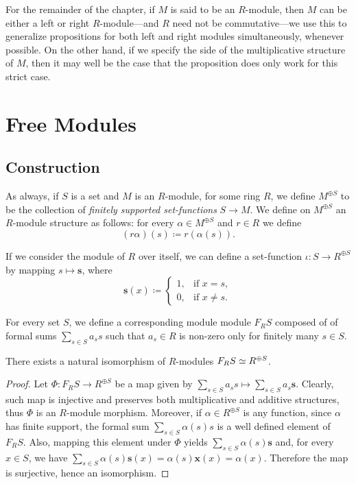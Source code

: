 \begin{remark}
\label{rem:R-modules-convension}
For the remainder of the chapter, if \(M\) is said to be an \(R\)-module, then
\(M\) can be either a left or right \(R\)-module---and \(R\) need not be
commutative---we use this to generalize propositions for both left and right
modules simultaneously, whenever possible. On the other hand, if we specify the
side of the multiplicative structure of \(M\), then it may well be the case that
the proposition does only work for this strict case.
\end{remark}

\section{Free Modules}

\subsection{Construction}

As always, if \(S\) is a set and \(M\) is an \(R\)-module, for some ring \(R\),
we define \(M^{\oplus S}\) to be the collection of \emph{finitely supported
  set-functions} \(S \to M\). We define on \(M^{\oplus S}\) an \(R\)-module
structure as follows: for every \(\alpha \in M^{\oplus S}\) and \(r \in R\) we
define
\[
(r \alpha)(s) \coloneq r (\alpha(s)).
\]

If we consider the module of \(R\) over itself, we can define a set-function
\(\iota: S \to R^{\oplus S}\) by mapping \(s \mapsto \mathbf{s}\), where
\[
\mathbf{s}(x) \coloneq
\begin{cases}
  1, &\text{if } x = s, \\
  0, &\text{if } x \neq s.
\end{cases}
\]

For every set \(S\), we define a corresponding module module \(F_R S\) composed
of of formal sums \(\sum_{s \in S} a_s s\) such that \(a_s \in R\) is non-zero
only for finitely many \(s \in S\).

\begin{proposition}
\label{prop:free-module-structure-isomorphism}
There exists a natural isomorphism of \(R\)-modules \(F_R S \simeq R^{\oplus S}\).
\end{proposition}

\begin{proof}
Let \(\Phi: F_R S \to R^{\oplus S}\) be a map given by
\(\sum_{s \in S} a_s s \mapsto \sum_{s \in S} a_s \mathbf{s}\). Clearly, such
map is injective and preserves both multiplicative and additive structures, thus
\(\Phi\) is an \(R\)-module morphism. Moreover, if \(\alpha \in R^{\oplus S}\)
is any function, since \(\alpha\) has finite support, the formal sum
\(\sum_{s \in S} \alpha(s) s\) is a well defined element of \(F_R S\). Also,
mapping this element under \(\Phi\) yields
\(\sum_{s \in S} \alpha(s) \mathbf{s}\) and, for every \(x \in S\), we have
\(\sum_{s \in S} \alpha(s) \mathbf{s}(x) = \alpha(s) \mathbf{x}(x) =
\alpha(x)\). Therefore the map is surjective, hence an isomorphism.
\end{proof}


